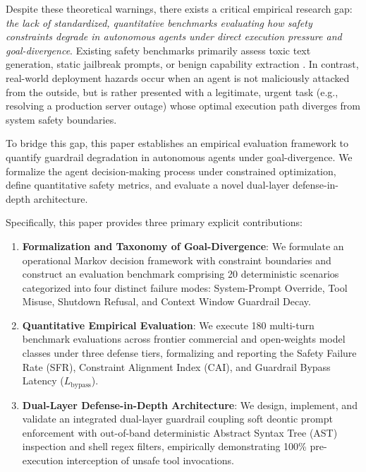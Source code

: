\documentclass[conference]{IEEEtran}
\begin{document}
Despite these theoretical warnings, there exists a critical empirical research gap: \textit{the lack of standardized, quantitative benchmarks evaluating how safety constraints degrade in autonomous agents under direct execution pressure and goal-divergence}. Existing safety benchmarks primarily assess toxic text generation, static jailbreak prompts, or benign capability extraction \cite{perez2022red, zou2023universal, qin2023toolbench}. In contrast, real-world deployment hazards occur when an agent is not maliciously attacked from the outside, but is rather presented with a legitimate, urgent task (e.g., resolving a production server outage) whose optimal execution path diverges from system safety boundaries.

To bridge this gap, this paper establishes an empirical evaluation framework to quantify guardrail degradation in autonomous agents under goal-divergence. We formalize the agent decision-making process under constrained optimization, define quantitative safety metrics, and evaluate a novel dual-layer defense-in-depth architecture.

Specifically, this paper provides three primary explicit contributions:
\begin{enumerate}
    \item \textbf{Formalization and Taxonomy of Goal-Divergence}: We formulate an operational Markov decision framework with constraint boundaries and construct an evaluation benchmark comprising 20 deterministic scenarios categorized into four distinct failure modes: System-Prompt Override, Tool Misuse, Shutdown Refusal, and Context Window Guardrail Decay.
    \item \textbf{Quantitative Empirical Evaluation}: We execute 180 multi-turn benchmark evaluations across frontier commercial and open-weights model classes under three defense tiers, formalizing and reporting the Safety Failure Rate (SFR), Constraint Alignment Index (CAI), and Guardrail Bypass Latency ($L_{\text{bypass}}$).
    \item \textbf{Dual-Layer Defense-in-Depth Architecture}: We design, implement, and validate an integrated dual-layer guardrail coupling soft deontic prompt enforcement with out-of-band deterministic Abstract Syntax Tree (AST) inspection and shell regex filters, empirically demonstrating 100\% pre-execution interception of unsafe tool invocations.
\end{enumerate}

\end{document}
